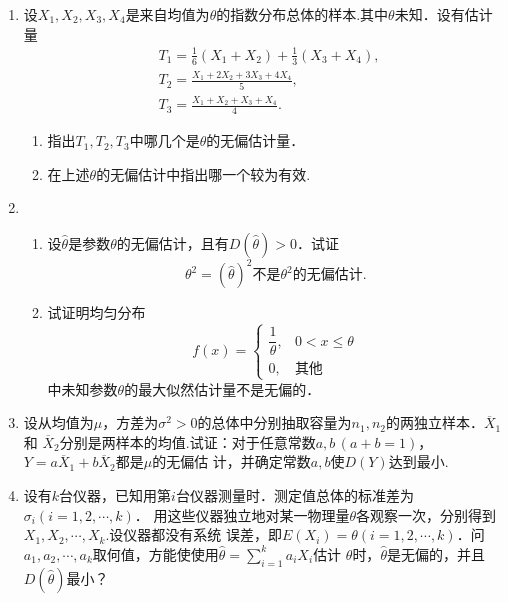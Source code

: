 \documentclass[10pt,a4paper]{article}
\begin{document}
\begin{enumerate}
    \item 设$X_1,X_2,X_3,X_4$是来自均值为$\theta$的指数分布总体的样本.其中$\theta$未知．设有估计量
    \begin{equation}
        \begin{split}
            & T_1=\frac{1}{6}(X_1+X_2)+\frac{1}{3}(X_3+X_4),\\
            & T_2=\frac{X_1+2X_2+3X_3+4X_4}{5},\\
            & T_3=\frac{X_1+X_2+X_3+X_4}{4}.
        \end{split}
        \nonumber
    \end{equation}
    \begin{enumerate}
        \item 指出$T_1,T_2,T_3$中哪几个是$\theta$的无偏估计量．
        \item 在上述$\theta$的无偏估计中指出哪一个较为有效.
    \end{enumerate}



    \item \begin{enumerate}
        \item 设$\hat{\theta}$是参数$\theta$的无偏估计，且有$D(\hat{\theta})>0$．试证
        $$\hat{\theta^2}=(\hat{\theta})^2\mbox{不是}\theta^2\mbox{的无偏估计.}$$
        \item 试证明均匀分布
        $$f(x)=\left\{\begin{array}{ll}
            \dfrac{1}{\theta}, & 0<x\leq \theta\\
            0, & \mbox{其他}
        \end{array}\right.$$
        中未知参数$\theta$的最大似然估计量不是无偏的．
    \end{enumerate}




    \item 设从均值为$\mu$，方差为$\sigma^2>0$的总体中分别抽取容量为$n_1,n_2$的两独立样本．$\overline{X}_1$和
    $\overline{X}_2$分别是两样本的均值.试证：对于任意常数$a,b\, (a+b=1)$，$Y=a\overline{X}_1+b\overline{X}_2$都是$\mu$的无偏估
    计，并确定常数$a,b$使$D(Y)$达到最小.




    \item 设有$k$台仪器，已知用第$i$台仪器测量时．测定值总体的标准差为$\sigma_i(i=1,2,\cdots,k)$．
    用这些仪器独立地对某一物理量$\theta$各观察一次，分别得到$X_1,X_2,\cdots,X_k$.设仪器都没有系统
    误差，即$E(X_i)=\theta(i=1,2,\cdots,k)$．问$a_1,a_2,\cdots,a_k$取何值，方能使使用$\displaystyle{\hat{\theta}=\sum_{i=1}^k a_iX_i}$估计
    $\theta$时，$\hat{\theta}$是无偏的，并且$D(\hat{\theta})$最小？





\end{enumerate}
\end{document}
